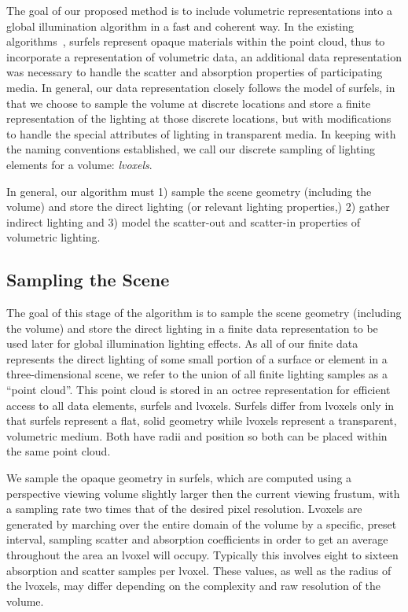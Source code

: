 \documentclass[runningheads]{llncs}
\begin{document}
The goal of our proposed method is to include volumetric representations into a global illumination algorithm in a fast and coherent way.  In the existing algorithms~\cite{christensen:2008}, surfels represent opaque materials within the point cloud, thus to incorporate a representation of volumetric data, an additional data representation was necessary to handle the scatter and absorption properties of participating media.  In general, our data representation closely follows the model of surfels, in that we choose to sample the volume at discrete locations and store a finite representation of the lighting at those discrete locations, but with modifications to handle the special attributes of lighting in transparent media.  In keeping with the naming conventions established, we call our discrete sampling of lighting elements for a volume: \emph{lvoxels}.  

In general, our algorithm must 1) sample the scene geometry (including the volume) and store the direct lighting (or relevant lighting properties,) 2) gather indirect lighting and 3) model the scatter-out and scatter-in properties of volumetric lighting.

\subsection{Sampling the Scene}
The goal of this stage of the algorithm is to sample the scene geometry (including the volume) and store the direct lighting in a finite data representation to be used later for global illumination lighting effects.  As all of our finite data represents the direct lighting of some small portion of a surface or element in a three-dimensional scene, we refer to the union of all finite lighting samples as a ``point cloud''.  This point cloud is stored in an octree representation for efficient access to all data elements, surfels and lvoxels.  Surfels differ from lvoxels only in that surfels represent a flat, solid geometry while lvoxels represent a transparent, volumetric medium.  Both have radii and position so both can be placed within the same point cloud.  

We sample the opaque geometry in surfels, which are computed using a perspective viewing volume slightly larger then the current viewing frustum, with a sampling rate two times that of the desired pixel resolution.  Lvoxels are generated by marching over the entire domain of the volume by a specific, preset interval, sampling scatter and absorption coefficients in order to get an average throughout the area an lvoxel will occupy.  Typically this involves eight to sixteen absorption and scatter samples per lvoxel.  These values, as well as the radius of the lvoxels, may differ depending on the complexity and raw resolution of the volume.
\end{document}
